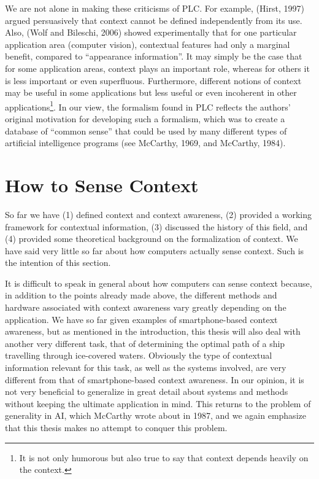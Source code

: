 We are not alone in making these criticisms of PLC. For example, (Hirst, 1997) argued persuasively that context cannot be defined independently from its use. Also, (Wolf and Bileschi, 2006) showed experimentally that for one particular application area (computer vision), contextual features had only a marginal benefit, compared to ``appearance information''. It may simply be the case that for some application areas, context plays an important role, whereas for others it is less important or even superfluous. Furthermore, different notions of context may be useful in some applications but less useful or even incoherent in other applications\footnote{It is not only humorous but also true to say that context depends heavily on the context.}. In our view, the formalism found in PLC reflects the authors' original motivation for developing such a formalism, which was to create a database of ``common sense'' that could be used by many different types of artificial intelligence programs (see McCarthy, 1969, and McCarthy, 1984).

%
%
\section{How to Sense Context}
\label{sec:how}
So far we have (1) defined context and context awareness, (2) provided a working framework for contextual information, (3) discussed the history of this field, and (4) provided some theoretical background on the formalization of context. We have said very little so far about how computers actually sense context. Such is the intention of this section.

It is difficult to speak in general about how computers can sense context because, in addition to the points already made above, the different methods and hardware associated with context awareness vary greatly depending on the application. We have so far given examples of smartphone-based context awareness, but as mentioned in the introduction, this thesis will also deal with another very different task, that of determining the optimal path of a ship travelling through ice-covered waters. Obviously the type of contextual information relevant for this task, as well as the systems involved, are very different from that of smartphone-based context awareness. In our opinion, it is not very beneficial to generalize in great detail about systems and methods without keeping the ultimate application in mind. This returns to the problem of generality in AI, which McCarthy wrote about in 1987, and we again emphasize that this thesis makes no attempt to conquer this problem.

